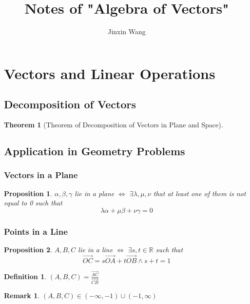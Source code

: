 \documentclass[onecolumn]{ctexart}
\title{Notes of "Algebra of Vectors"}
\author{Jinxin Wang}
\date{}
\newtheorem{definition}{Definition}
\newtheorem{theorem}{Theorem}
\newtheorem{proposition}{Proposition}
\newtheorem{remark}{Remark}
\begin{document}
\maketitle

\section{Vectors and Linear Operations}

\subsection{Decomposition of Vectors}

\begin{theorem}[Theorem of Decomposition of Vectors in Plane and Space]
  
\end{theorem}

\subsection{Application in Geometry Problems}

\subsubsection{Vectors in a Plane}

\begin{proposition}
  $\alpha, \beta, \gamma$ lie in a plane $\Leftrightarrow$ $\exists \lambda, \mu, 
  \nu$ that at least one of them is not equal to 0 such that
  \begin{equation}
    \lambda \alpha + \mu \beta + \nu \gamma = 0
  \end{equation}
\end{proposition}

\subsubsection{Points in a Line}

\begin{proposition}
  $A, B, C$ lie in a line $\Leftrightarrow$ $\exists s, t \in \mathbb{R}$ such 
  that
  \begin{equation}
    \vec{OC} = s \vec{OA} + t \vec{OB} \wedge s + t = 1
  \end{equation}
\end{proposition}

\begin{definition}
  $(A, B, C) = \frac{\vec{AC}}{\vec{CB}}$
\end{definition}
\begin{remark}
  $(A, B, C) \in (-\infty, -1) \cup (-1, \infty)$
\end{remark}
\end{document}
